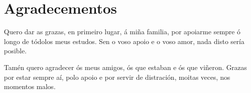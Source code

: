 \pagestyle{plain}
\chapter*{Agradecementos}
Quero dar as grazas, en primeiro lugar, á miña familia, por apoiarme sempre ó longo de tódolos meus estudos. Sen o voso apoio e o voso amor, nada disto sería posible.

Tamén quero agradecer ós meus amigos, ós que estaban e ós que viñeron. Grazas por estar sempre aí, polo apoio e por servir de distración, moitas veces, nos momentos malos.

